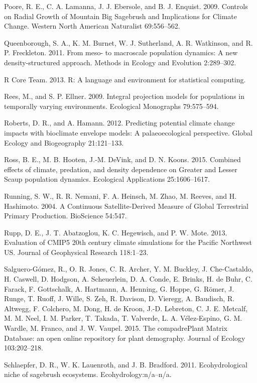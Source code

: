 \documentclass[12pt,]{article}
\begin{document}
Poore, R. E., C. A. Lamanna, J. J. Ebersole, and B. J. Enquist. 2009.
Controls on Radial Growth of Mountain Big Sagebrush and Implications for
Climate Change. Western North American Naturalist 69:556--562.

Queenborough, S. A., K. M. Burnet, W. J. Sutherland, A. R. Watkinson,
and R. P. Freckleton. 2011. From meso- to macroscale population
dynamics: A new density-structured approach. Methods in Ecology and
Evolution 2:289--302.

R Core Team. 2013. R: A language and environment for statistical
computing.

Rees, M., and S. P. Ellner. 2009. Integral projection models for
populations in temporally varying environments. Ecological Monographs
79:575--594.

Roberts, D. R., and A. Hamann. 2012. Predicting potential climate change
impacts with bioclimate envelope models: A palaeoecological perspective.
Global Ecology and Biogeography 21:121--133.

Ross, B. E., M. B. Hooten, J.-M. DeVink, and D. N. Koons. 2015. Combined
effects of climate, predation, and density dependence on Greater and
Lesser Scaup population dynamics. Ecological Applications 25:1606--1617.

Running, S. W., R. R. Nemani, F. A. Heinsch, M. Zhao, M. Reeves, and H.
Hashimoto. 2004. A Continuous Satellite-Derived Measure of Global
Terrestrial Primary Production. BioScience 54:547.

Rupp, D. E., J. T. Abatzoglou, K. C. Hegewisch, and P. W. Mote. 2013.
Evaluation of CMIP5 20th century climate simulations for the Pacific
Northwest US. Journal of Geophysical Research 118:1--23.

Salguero-G{ó}mez, R., O. R. Jones, C. R. Archer, Y. M. Buckley, J.
Che-Castaldo, H. Caswell, D. Hodgson, A. Scheuerlein, D. A. Conde, E.
Brinks, H. de Buhr, C. Farack, F. Gottschalk, A. Hartmann, A. Henning,
G. Hoppe, G. R{ö}mer, J. Runge, T. Ruoff, J. Wille, S. Zeh, R. Davison,
D. Vieregg, A. Baudisch, R. Altwegg, F. Colchero, M. Dong, H. de Kroon,
J.-D. Lebreton, C. J. E. Metcalf, M. M. Neel, I. M. Parker, T. Takada,
T. Valverde, L. A. V{é}lez-Espino, G. M. Wardle, M. Franco, and J. W.
Vaupel. 2015. The compadrePlant Matrix Database: an open online
repository for plant demography. Journal of Ecology 103:202--218.

Schlaepfer, D. R., W. K. Lauenroth, and J. B. Bradford. 2011.
Ecohydrological niche of sagebrush ecosystems. Ecohydrology:n/a--n/a.
\end{document}
